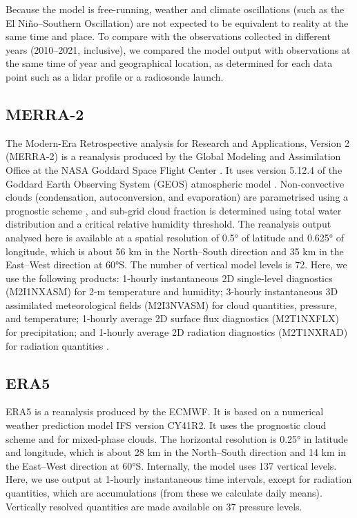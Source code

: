 \documentclass[12pt,a4paper]{article}
\begin{document}
Because the model is free-running, weather and climate oscillations (such as
the El Niño--Southern Oscillation) are not expected to be equivalent to reality
at the same time and place. To compare with the observations collected in
different years (2010--2021, inclusive), we compared the model output with
observations at the same time of year and geographical location, as determined
for each data point such as a lidar profile or a radiosonde launch.

\subsection{MERRA-2}

The Modern-Era Retrospective analysis for Research and Applications, Version 2
(MERRA-2) is a reanalysis produced by the Global Modeling and Assimilation
Office at the NASA Goddard Space Flight Center \citep{gelaro2017}.  It uses
version 5.12.4 of the Goddard Earth Observing System (GEOS) atmospheric model
\citep{rienecker2008,molod2015}. Non-convective clouds (condensation, autoconversion, and evaporation) are parametrised using a prognostic scheme \citep{bacmeister2006}, and sub-grid cloud fraction is determined using total water distribution and a critical relative humidity threshold. The reanalysis output analysed here is
available at a spatial resolution of 0.5° of latitude and 0.625° of longitude,
which is about 56 km in the North--South direction and 35 km in the East--West
direction at 60°S. The number of vertical model levels is 72. Here, we use the
following products: 1-hourly instantaneous 2D single-level diagnostics
(M2I1NXASM) for 2-m temperature and humidity; 3-hourly instantaneous 3D
assimilated meteorological fields (M2I3NVASM) for cloud quantities, pressure,
and temperature; 1-hourly average 2D surface flux diagnostics (M2T1NXFLX) for
precipitation; and 1-hourly average 2D radiation diagnostics
(M2T1NXRAD) for radiation quantities \citep{merra2}.

\subsection{ERA5}

ERA5 \citep{era5} is a reanalysis produced by the ECMWF.  It is based on a
numerical weather prediction model IFS version CY41R2.  It uses the \cite{tiedtke1993} prognostic cloud scheme and \cite{forbes2014} for mixed-phase clouds. The horizontal
resolution is 0.25° in latitude and longitude, which is about 28 km in the
North--South direction and 14 km in the East--West direction at 60°S.
Internally, the model uses 137 vertical levels. Here, we use output at 1-hourly
instantaneous time intervals, except for radiation quantities, which are
accumulations (from these we calculate daily means).  Vertically resolved
quantities are made available on 37 pressure levels.
\end{document}
